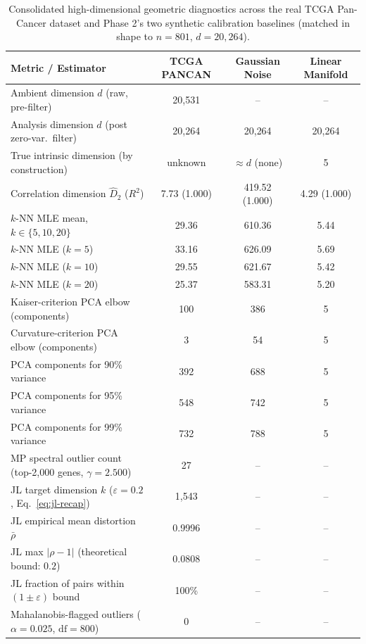 \documentclass[11pt]{article}
\begin{document}
\begin{table}[H]
\centering
\caption{Consolidated high-dimensional geometric diagnostics across the
real TCGA Pan-Cancer dataset and Phase 2's two synthetic calibration
baselines (matched in shape to $n=801$, $d=20{,}264$).}
\label{tab:consolidated}
\begin{tabular}{lccc}
\toprule
\textbf{Metric / Estimator} & \textbf{TCGA PANCAN} & \textbf{Gaussian Noise} & \textbf{Linear Manifold} \\
\midrule
Ambient dimension $d$ (raw, pre-filter) & 20{,}531 & -- & -- \\
Analysis dimension $d$ (post zero-var.\ filter) & 20{,}264 & 20{,}264 & 20{,}264 \\
True intrinsic dimension (by construction) & unknown & $\approx d$ (none) & 5 \\
Correlation dimension $\hat D_2$ ($R^2$) & 7.73 (1.000) & 419.52 (1.000) & 4.29 (1.000) \\
$k$-NN MLE mean, $k \in \{5,10,20\}$ & 29.36 & 610.36 & 5.44 \\
\quad$k$-NN MLE ($k=5$) & 33.16 & 626.09 & 5.69 \\
\quad$k$-NN MLE ($k=10$) & 29.55 & 621.67 & 5.42 \\
\quad$k$-NN MLE ($k=20$) & 25.37 & 583.31 & 5.20 \\
Kaiser-criterion PCA elbow (components) & 100 & 386 & 5 \\
Curvature-criterion PCA elbow (components) & 3 & 54 & 5 \\
PCA components for 90\% variance & 392 & 688 & 5 \\
PCA components for 95\% variance & 548 & 742 & 5 \\
PCA components for 99\% variance & 732 & 788 & 5 \\
MP spectral outlier count (top-2,000 genes, $\gamma=2.500$) & 27 & -- & -- \\
JL target dimension $k$ ($\varepsilon=0.2$, Eq.~\ref{eq:jl-recap}) & 1{,}543 & -- & -- \\
JL empirical mean distortion $\bar\rho$ & 0.9996 & -- & -- \\
JL max $|\rho - 1|$ (theoretical bound: $0.2$) & 0.0808 & -- & -- \\
JL fraction of pairs within $(1\pm\varepsilon)$ bound & 100\% & -- & -- \\
Mahalanobis-flagged outliers ($\alpha=0.025$, $\mathrm{df}=800$) & 0 & -- & -- \\
\bottomrule
\end{tabular}
\end{table}
\end{document}
